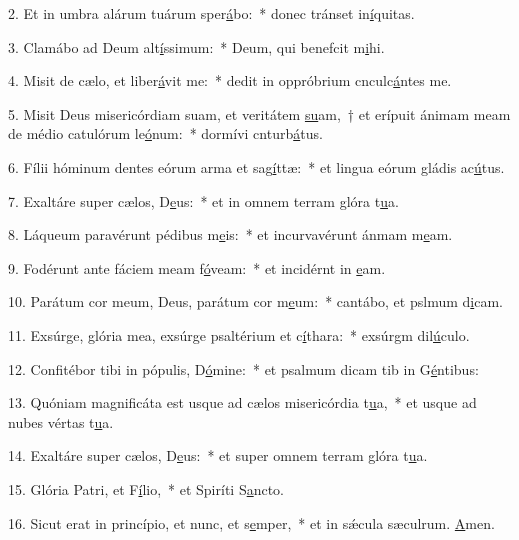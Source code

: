 2. Et in umbra alárum tuárum sper\uline{á}bo:~* donec tránset in\uline{í}quitas.\par 
3. Clamábo ad Deum alt\uline{í}ssimum:~* Deum, qui benefcit m\uline{i}hi.\par 
4. Misit de cælo, et liber\uline{á}vit me:~* dedit in oppróbrium cnculc\uline{á}ntes me.\par 
5. Misit Deus misericórdiam suam, et veritátem \uline{su}am,~† et erípuit ánimam meam de médio catulórum le\uline{ó}num:~* dormívi cnturb\uline{á}tus.\par 
6. Fílii hóminum dentes eórum arma et sag\uline{í}ttæ:~* et lingua eórum gládis ac\uline{ú}tus.\par 
7. Exaltáre super cælos, D\uline{e}us:~* et in omnem terram glóra t\uline{u}a.\par 
8. Láqueum paravérunt pédibus m\uline{e}is:~* et incurvavérunt ánmam m\uline{e}am.\par 
9. Fodérunt ante fáciem meam f\uline{ó}veam:~* et incidérnt in \uline{e}am.\par 
10. Parátum cor meum, Deus, parátum cor m\uline{e}um:~* cantábo, et pslmum d\uline{i}cam.\par 
11. Exsúrge, glória mea, exsúrge psaltérium et c\uline{í}thara:~* exsúrgm dil\uline{ú}culo.\par 
12. Confitébor tibi in pópulis, D\uline{ó}mine:~* et psalmum dicam tib in G\uline{é}ntibus:\par 
13. Quóniam magnificáta est usque ad cælos misericórdia t\uline{u}a,~* et usque ad nubes vértas t\uline{u}a.\par 
14. Exaltáre super cælos, D\uline{e}us:~* et super omnem terram glóra t\uline{u}a.\par 
15. Glória Patri, et F\uline{í}lio,~* et Spiríti S\uline{a}ncto.\par 
16. Sicut erat in princípio, et nunc, et s\uline{e}mper,~* et in sǽcula sæculrum. \uline{A}men.\par 

